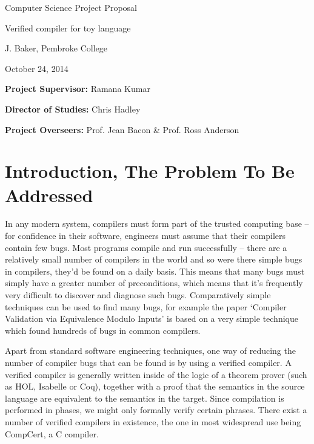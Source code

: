\documentclass[12pt,a4paper,twoside]{article}
\begin{document}
\vfil

\centerline{\Large Computer Science Project Proposal}
\vspace{0.4in}
\centerline{\Large Verified compiler for toy language}
\vspace{0.4in}
\centerline{\large J. Baker, Pembroke College}
\vspace{0.3in}
\centerline{\large October 24, 2014}

\vfil

\noindent
{\bf Project Supervisor:} Ramana Kumar
\vspace{0.2in}

\noindent
{\bf Director of Studies:} Chris Hadley
\vspace{0.2in}
\noindent
 
\noindent
{\bf Project Overseers:} Prof. Jean Bacon  \& Prof. Ross Anderson



\section*{Introduction, The Problem To Be Addressed}

In any modern system, compilers must form part of the trusted computing base --
for confidence in their software, engineers must assume that their compilers
contain few bugs. Most programs compile and run successfully -- there are a
relatively small number of compilers in the world and so were there simple bugs
in compilers, they'd be found on a daily basis. This means that many bugs must
simply have a greater number of preconditions, which means that it's frequently
very difficult to discover and diagnose such bugs. Comparatively simple
techniques can be used to find many bugs, for example the paper `Compiler
Validation via Equivalence Modulo Inputs' is based on a very simple technique
which found hundreds of bugs in common compilers.

Apart from standard software engineering techniques, one way of reducing the
number of compiler bugs that can be found is by using a verified compiler.
A verified compiler is generally written inside of the logic of a theorem
prover (such as HOL, Isabelle or Coq), together with a proof that the
semantics in the source language are equivalent to the semantics in the
target. Since compilation is performed in phases, we might only formally
verify certain phrases. There exist a number of verified compilers in
existence, the one in most widespread use being CompCert, a C compiler.
\end{document}
